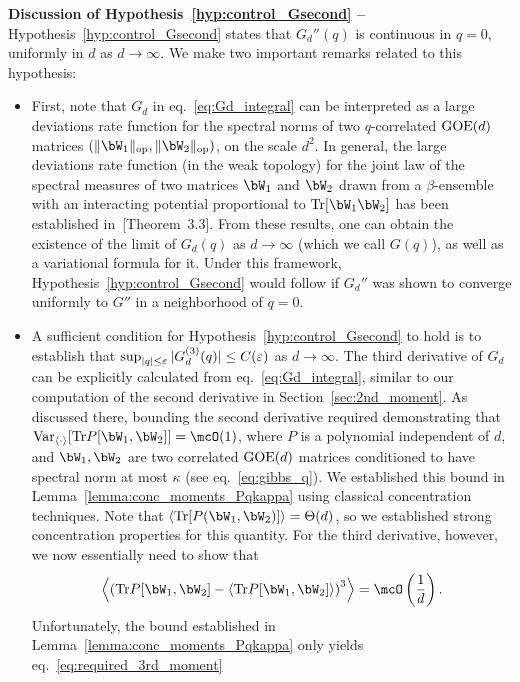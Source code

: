 \noindent
\textbf{Discussion of Hypothesis~\ref{hyp:control_Gsecond} --}
Hypothesis~\ref{hyp:control_Gsecond} states that $G_d''(q)$ is continuous in $q = 0$, uniformly in $d$ as $d \to \infty$.
We make two important remarks related to this hypothesis:
\begin{itemize}[leftmargin=*]
    \item First, note that $G_d$ in eq.~\eqref{eq:Gd_integral} can be interpreted as a large deviations rate function for the spectral norms of two $q$-correlated $\mathrm{GOE}(d)$ matrices $(\|\bW_1\|_\op, \|\bW_2\|_\op)$, 
    on the scale $d^2$. 
    In general, the large deviations rate function (in the weak topology) for the joint law of the spectral measures of two matrices $\bW_1$ and $\bW_2$
    drawn from a $\beta$-ensemble with an interacting potential proportional to $\Tr[\bW_1 \bW_2]$ has been established in~\cite{guionnet2004first}[Theorem~3.3]. 
    From these results, one can obtain the existence of the limit of $G_d(q)$ as $d \to \infty$ (which we call $G(q)$), as well as a variational formula for it.
    Under this framework, Hypothesis~\ref{hyp:control_Gsecond} would follow if $G_d''$ was shown to converge uniformly to $G''$ in a neighborhood of $q = 0$.
    \item A sufficient condition for Hypothesis~\ref{hyp:control_Gsecond} to hold is to establish that $\sup_{|q| \leq \varepsilon} |G_d^{(3)}(q)| \leq C(\varepsilon)$ as $d \to \infty$.
    The third derivative of $G_d$ can be explicitly calculated from eq.~\eqref{eq:Gd_integral}, similar to our computation of the second derivative in Section~\ref{sec:2nd_moment}.
    As discussed there, bounding the second derivative required demonstrating that $\Var_{\langle \cdot \rangle}[\Tr P[\bW_1, \bW_2]] = \mcO(1)$, where $P$ is a polynomial independent of $d$, and $\bW_1, \bW_2$ are two correlated $\mathrm{GOE}(d)$ matrices conditioned to have spectral norm at most $\kappa$ (see eq.~\eqref{eq:gibbs_q}).
    We established this bound in Lemma~\ref{lemma:conc_moments_Pqkappa} using classical concentration techniques.
    Note that $\langle \Tr[P(\bW_1, \bW_2)]\rangle = \Theta(d)$, so we established strong concentration properties for this quantity.
    For the third derivative, however, we now essentially need to show that
    \begin{equation}\label{eq:required_3rd_moment}
        \left\langle\left(\Tr P[\bW_1, \bW_2] - \langle \Tr P[\bW_1, \bW_2] \rangle\right)^3\right\rangle = \mcO\left(\frac{1}{d}\right).
    \end{equation}
    Unfortunately, the bound established in Lemma~\ref{lemma:conc_moments_Pqkappa} only yields eq.~\eqref{eq:required_3rd_moment} 

\end{itemize}
